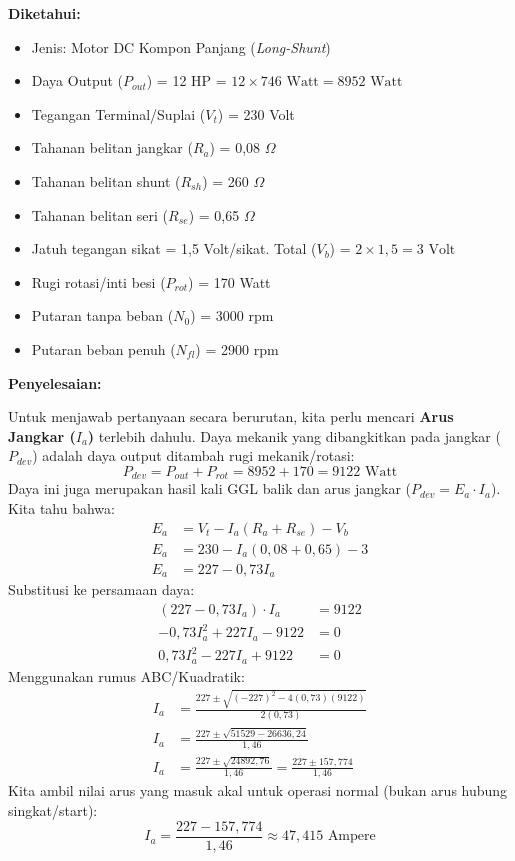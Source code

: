 \documentclass[12pt, a4paper]{article}
\begin{document}
\textbf{Diketahui:}
\begin{itemize}
    \item Jenis: Motor DC Kompon Panjang (\textit{Long-Shunt})
    \item Daya Output ($P_{out}$) = 12 HP = $12 \times 746 \text{ Watt} = 8952 \text{ Watt}$
    \item Tegangan Terminal/Suplai ($V_t$) = 230 Volt
    \item Tahanan belitan jangkar ($R_a$) = 0,08 $\Omega$
    \item Tahanan belitan shunt ($R_{sh}$) = 260 $\Omega$
    \item Tahanan belitan seri ($R_{se}$) = 0,65 $\Omega$
    \item Jatuh tegangan sikat = 1,5 Volt/sikat. Total ($V_b$) = $2 \times 1,5 = 3 \text{ Volt}$
    \item Rugi rotasi/inti besi ($P_{rot}$) = 170 Watt
    \item Putaran tanpa beban ($N_0$) = 3000 rpm
    \item Putaran beban penuh ($N_{fl}$) = 2900 rpm
\end{itemize}

\textbf{Penyelesaian:}

Untuk menjawab pertanyaan secara berurutan, kita perlu mencari \textbf{Arus Jangkar ($I_a$)} terlebih dahulu.
Daya mekanik yang dibangkitkan pada jangkar ($P_{dev}$) adalah daya output ditambah rugi mekanik/rotasi:
\[
    P_{dev} = P_{out} + P_{rot} = 8952 + 170 = 9122 \text{ Watt}
\]
Daya ini juga merupakan hasil kali GGL balik dan arus jangkar ($P_{dev} = E_a \cdot I_a$).
Kita tahu bahwa:
\begin{align*}
    E_a &= V_t - I_a(R_a + R_{se}) - V_b \\
    E_a &= 230 - I_a(0,08 + 0,65) - 3 \\
    E_a &= 227 - 0,73 I_a
\end{align*}
Substitusi ke persamaan daya:
\begin{align*}
    (227 - 0,73 I_a) \cdot I_a &= 9122 \\
    -0,73 I_a^2 + 227 I_a - 9122 &= 0 \\
    0,73 I_a^2 - 227 I_a + 9122 &= 0
\end{align*}
Menggunakan rumus ABC/Kuadratik:
\begin{align*}
    I_a &= \frac{227 \pm \sqrt{(-227)^2 - 4(0,73)(9122)}}{2(0,73)} \\
    I_a &= \frac{227 \pm \sqrt{51529 - 26636,24}}{1,46} \\
    I_a &= \frac{227 \pm \sqrt{24892,76}}{1,46} = \frac{227 \pm 157,774}{1,46}
\end{align*}
Kita ambil nilai arus yang masuk akal untuk operasi normal (bukan arus hubung singkat/start):
\[
    I_a = \frac{227 - 157,774}{1,46} \approx 47,415 \text{ Ampere}
\]
\end{document}
